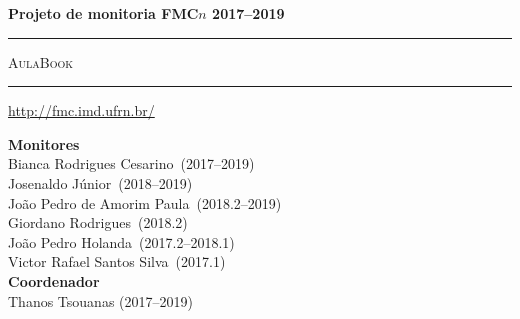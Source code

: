 \thispagestyle{empty}
\begin{center}
\Large
\parindent=0pt

\begin{flushright}
\ttfamily
\compiletime
\end{flushright}

\vspace{\stretch1}

{\bfseries\huge Projeto de monitoria FMC$n$ 2017--2019}

\vspace{5mm}

\rule{\textwidth}{2mm}

\vspace{1cm}

{\scshape\Huge AulaBook}

\vspace{1cm}

\rule{\textwidth}{2mm}

\vspace{5mm}

\url{http://fmc.imd.ufrn.br/}

\vspace{1cm}

\vspace{\stretch1}

\begin{center}
{\bfseries\sffamily Monitores}\\
Bianca Rodrigues Cesarino~(2017--2019)\\
Josenaldo Júnior~(2018--2019)\\
João Pedro de Amorim Paula~(2018.2--2019)\\
Giordano Rodrigues~(2018.2)\\
João Pedro Holanda~(2017.2--2018.1)\\
Victor Rafael Santos Silva~(2017.1)\\[1.5em]
{\bfseries\sffamily Coordenador}\\
Thanos Tsouanas (2017--2019)\\
\end{center}

\vspace{\stretch1}

\end{center}
